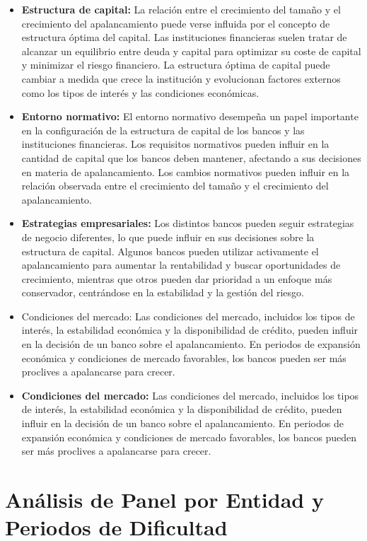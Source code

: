 \documentclass[a4paper,fleqn]{cas-sc}
\begin{document}
\begin{itemize}
    \item \textbf{Estructura de capital:} La relación entre el crecimiento del tamaño y el crecimiento del apalancamiento puede verse influida por el concepto de estructura óptima del capital. Las instituciones financieras suelen tratar de alcanzar un equilibrio entre deuda y capital para optimizar su coste de capital y minimizar el riesgo financiero. La estructura óptima de capital puede cambiar a medida que crece la institución y evolucionan factores externos como los tipos de interés y las condiciones económicas.
    \item \textbf{Entorno normativo:} El entorno normativo desempeña un papel importante en la configuración de la estructura de capital de los bancos y las instituciones financieras. Los requisitos normativos pueden influir en la cantidad de capital que los bancos deben mantener, afectando a sus decisiones en materia de apalancamiento. Los cambios normativos pueden influir en la relación observada entre el crecimiento del tamaño y el crecimiento del apalancamiento.
    \item \textbf{Estrategias empresariales:} Los distintos bancos pueden seguir estrategias de negocio diferentes, lo que puede influir en sus decisiones sobre la estructura de capital. Algunos bancos pueden utilizar activamente el apalancamiento para aumentar la rentabilidad y buscar oportunidades de crecimiento, mientras que otros pueden dar prioridad a un enfoque más conservador, centrándose en la estabilidad y la gestión del riesgo.
    \item Condiciones del mercado: Las condiciones del mercado, incluidos los tipos de interés, la estabilidad económica y la disponibilidad de crédito, pueden influir en la decisión de un banco sobre el apalancamiento. En periodos de expansión económica y condiciones de mercado favorables, los bancos pueden ser más proclives a apalancarse para crecer.
    \item \textbf{Condiciones del mercado:} Las condiciones del mercado, incluidos los tipos de interés, la estabilidad económica y la disponibilidad de crédito, pueden influir en la decisión de un banco sobre el apalancamiento. En periodos de expansión económica y condiciones de mercado favorables, los bancos pueden ser más proclives a apalancarse para crecer.
\end{itemize}


\section{Análisis de Panel por Entidad y Periodos de Dificultad}
\end{document}
